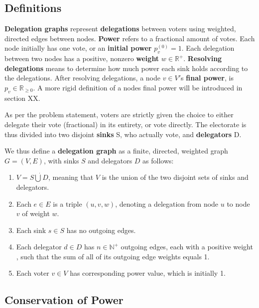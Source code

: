\subsection{Definitions}

\textbf{Delegation graphs} represent \textbf{delegations} between voters using weighted, directed edges between nodes. \textbf{Power} refers to a fractional amount of votes. Each node initially has one vote, or an \textbf{initial power} $p^{(0)}_v = 1$. Each delegation between two nodes has a positive, nonzero \textbf{weight} $w \in \mathbb{R}^+$. \textbf{Resolving delegations} means to determine how much power each sink holds according to the delegations. After resolving delegations, a node $v \in V'$s \textbf{final power}, is $p_v \in \mathbb{R}_{\ge0}$. A more rigid definition of a nodes final power will be introduced in section XX.

As per the problem statement, voters are strictly given the choice to either delegate their vote (fractional) in its entirety, or vote directly. The electorate is thus divided into two disjoint \textbf{sinks} S, who actually vote, and \textbf{delegators} D. 

We thus define a \textbf{delegation graph} as a finite, directed, weighted graph $G = (V, E)$, with sinks $S$ and delegators $D$ as follows:

\begin{enumerate}
\item $V = S \dot\bigcup D$, meaning that $V$ is the union of the two disjoint sets of sinks and delegators.
\item Each $e \in E$ is a triple $(u, v, w)$, denoting a delegation from node $u$ to node $v$ of weight $w$.
\item Each sink $s \in S$ has no outgoing edges.
\item Each delegator $d \in D$ has $n \in \mathbb{N}^+$ outgoing edges, each with a positive weight \footnotemark, such that the sum of all of its outgoing edge weights equals 1.
\item Each voter $v \in V$ has corresponding power value, which is initially 1.
\end{enumerate}


 \subsection{Conservation of Power}
 
